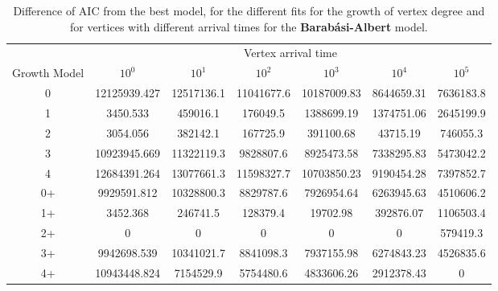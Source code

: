 \begin{table}[H]
\centering
\begin{tabular}{ccccccc}
                                  & \multicolumn{6}{c}{Vertex arrival time}                                       \\
\multicolumn{1}{c|}{Growth Model} & $10^0$       & $10^1$     & $10^2$     & $10^3$      & $10^4$     & $10^5$    \\ \hline
\multicolumn{1}{c|}{0}            & 12125939.427 & 12517136.1 & 11041677.6 & 10187009.83 & 8644659.31 & 7636183.8 \\
\multicolumn{1}{c|}{1}            & 3450.533     & 459016.1   & 176049.5   & 1388699.19  & 1374751.06 & 2645199.9 \\
\multicolumn{1}{c|}{2}            & 3054.056     & 382142.1   & 167725.9   & 391100.68   & 43715.19   & 746055.3  \\
\multicolumn{1}{c|}{3}            & 10923945.669 & 11322119.3 & 9828807.6  & 8925473.58  & 7338295.83 & 5473042.2 \\
\multicolumn{1}{c|}{4}            & 12684391.264 & 13077661.3 & 11598327.7 & 10703850.23 & 9190454.28 & 7397852.7 \\
\multicolumn{1}{c|}{0+}           & 9929591.812  & 10328800.3 & 8829787.6  & 7926954.64  & 6263945.63 & 4510606.2 \\
\multicolumn{1}{c|}{1+}           & 3452.368     & 246741.5   & 128379.4   & 19702.98    & 392876.07  & 1106503.4 \\
\multicolumn{1}{c|}{2+}           & 0            & 0          & 0          & 0           & 0          & 579419.3  \\
\multicolumn{1}{c|}{3+}           & 9942698.539  & 10341021.7 & 8841098.3  & 7937155.98  & 6274843.23 & 4526835.6 \\
\multicolumn{1}{c|}{4+}           & 10943448.824 & 7154529.9  & 5754480.6  & 4833606.26  & 2912378.43 & 0        
\end{tabular}
\caption{Difference of AIC from the best model, for the different fits for the growth of vertex degree and for vertices with different arrival times for the \textbf{Barabási-Albert} model.}
\label{tab:BA_evolution_diff}
\end{table}




